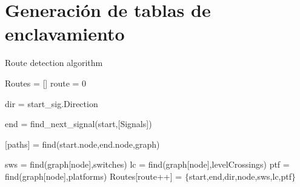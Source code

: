 \section{Generación de tablas de enclavamiento}

	\label{sec:rutas}
	
	
	\lipsum[1-5]
	
	\begin{algorithm}[hbt!]
        \caption{Route detection algorithm}\label{alg:routes}
        \DontPrintSemicolon
        \SetNoFillComment
        \LinesNotNumbered 
        Routes = []\; 
        route = 0\;
        {
            {
                dir = start\_sig.Direction\;
                
                end = find\_next\_signal(start,[Signals])\;

                [paths] = find(start.node,end.node,graph)\;
                
                {
                    sws = find(graph[node],switches)\;
                    lc = find(graph[node],levelCrossings)\;
                    ptf = find(graph[node],platforms)\;
                    Routes[route++] = $\{$start,end,dir,node,sws,lc,ptf$\}$\;
                }
            }
        }
        \KwResult{[Routes]} 
    \end{algorithm}
    
    
